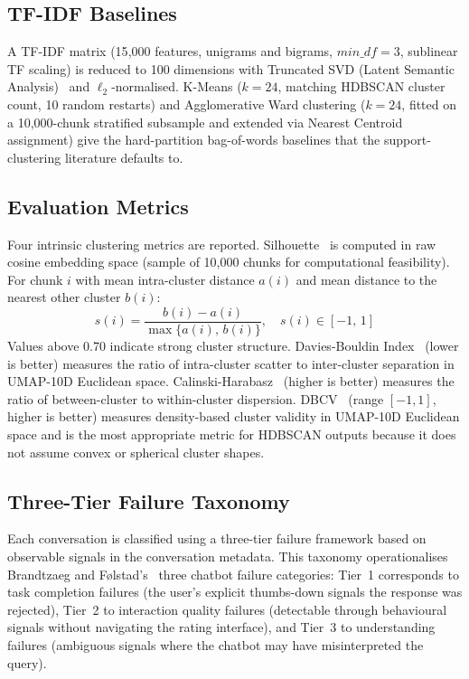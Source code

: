 \documentclass[conference]{IEEEtran}
\begin{document}
\subsection{TF-IDF Baselines}

A TF-IDF matrix (15{,}000 features, unigrams and bigrams, $min\_df{=}3$, sublinear TF scaling) is reduced to 100 dimensions with Truncated SVD (Latent Semantic Analysis)~\cite{deerwester1990indexing} and $\ell_2$-normalised. K-Means ($k{=}24$, matching HDBSCAN cluster count, 10 random restarts) and Agglomerative Ward clustering ($k{=}24$, fitted on a 10{,}000-chunk stratified subsample and extended via Nearest Centroid assignment) give the hard-partition bag-of-words baselines that the support-clustering literature defaults to.

\subsection{Evaluation Metrics}

Four intrinsic clustering metrics are reported. Silhouette~\cite{rousseeuw1987silhouettes} is computed in raw cosine embedding space (sample of 10{,}000 chunks for computational feasibility). For chunk $i$ with mean intra-cluster distance $a(i)$ and mean distance to the nearest other cluster $b(i)$:
\begin{equation}
  s(i) = \frac{b(i) - a(i)}{\max\bigl\{a(i),\,b(i)\bigr\}},
  \quad s(i) \in [-1,\,1]
  \label{eq:silhouette}
\end{equation}
Values above 0.70 indicate strong cluster structure. Davies-Bouldin Index~\cite{davies1979cluster} (lower is better) measures the ratio of intra-cluster scatter to inter-cluster separation in UMAP-10D Euclidean space. Calinski-Harabasz~\cite{calinski1974dendrite} (higher is better) measures the ratio of between-cluster to within-cluster dispersion. DBCV~\cite{moulavi2014dbcv} (range $[-1, 1]$, higher is better) measures density-based cluster validity in UMAP-10D Euclidean space and is the most appropriate metric for HDBSCAN outputs because it does not assume convex or spherical cluster shapes.

\subsection{Three-Tier Failure Taxonomy}
\label{sec:failure-method}

Each conversation is classified using a three-tier failure framework based on observable signals in the conversation metadata. This taxonomy operationalises Brandtzaeg and F{\o}lstad's~\cite{brandtzaeg2017people} three chatbot failure categories: Tier~1 corresponds to task completion failures (the user's explicit thumbs-down signals the response was rejected), Tier~2 to interaction quality failures (detectable through behavioural signals without navigating the rating interface), and Tier~3 to understanding failures (ambiguous signals where the chatbot may have misinterpreted the query).
\end{document}
